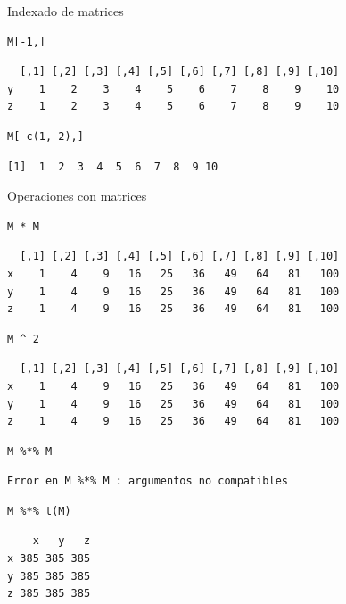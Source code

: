 \documentclass[xcolor={usenames,svgnames,dvipsnames}]{beamer}
\begin{document}
\begin{frame}[fragile,label=sec-2-2-6]{Indexado de matrices}
 \lstset{language=R,label= ,caption= ,numbers=none}
\begin{lstlisting}
M[-1,]
\end{lstlisting}

\begin{verbatim}
  [,1] [,2] [,3] [,4] [,5] [,6] [,7] [,8] [,9] [,10]
y    1    2    3    4    5    6    7    8    9    10
z    1    2    3    4    5    6    7    8    9    10
\end{verbatim}

\lstset{language=R,label= ,caption= ,numbers=none}
\begin{lstlisting}
M[-c(1, 2),]
\end{lstlisting}

\begin{verbatim}
[1]  1  2  3  4  5  6  7  8  9 10
\end{verbatim}
\end{frame}

\begin{frame}[fragile,label=sec-2-2-7]{Operaciones con matrices}
 \lstset{language=R,label= ,caption= ,numbers=none}
\begin{lstlisting}
M * M
\end{lstlisting}

\begin{verbatim}
  [,1] [,2] [,3] [,4] [,5] [,6] [,7] [,8] [,9] [,10]
x    1    4    9   16   25   36   49   64   81   100
y    1    4    9   16   25   36   49   64   81   100
z    1    4    9   16   25   36   49   64   81   100
\end{verbatim}

\lstset{language=R,label= ,caption= ,numbers=none}
\begin{lstlisting}
M ^ 2
\end{lstlisting}

\begin{verbatim}
  [,1] [,2] [,3] [,4] [,5] [,6] [,7] [,8] [,9] [,10]
x    1    4    9   16   25   36   49   64   81   100
y    1    4    9   16   25   36   49   64   81   100
z    1    4    9   16   25   36   49   64   81   100
\end{verbatim}

\lstset{language=R,label= ,caption= ,numbers=none}
\begin{lstlisting}
M %*% M
\end{lstlisting}

\begin{verbatim}
Error en M %*% M : argumentos no compatibles
\end{verbatim}

\lstset{language=R,label= ,caption= ,numbers=none}
\begin{lstlisting}
M %*% t(M)
\end{lstlisting}

\begin{verbatim}
    x   y   z
x 385 385 385
y 385 385 385
z 385 385 385
\end{verbatim}
\end{frame}
\end{document}
